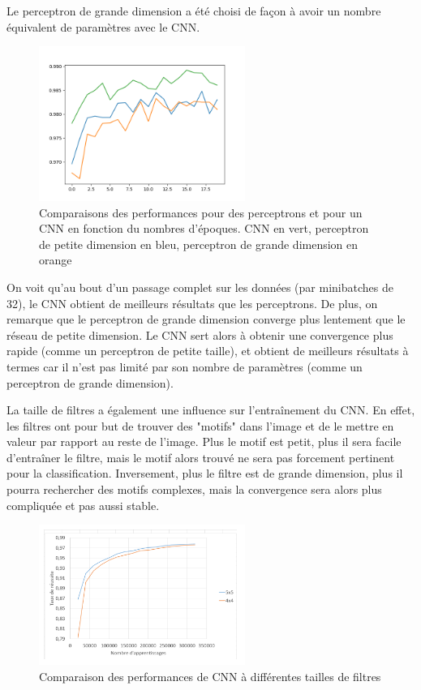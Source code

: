 Le perceptron de grande dimension a été choisi de façon à avoir un nombre équivalent de paramètres avec le CNN.

\begin{figure}[h]
    \center 
    \includegraphics[width=0.6\textwidth]{img/fc_vs_cnn.png}
    \caption[Comparaisons des performances pour des perceptrons et pour un CNN]{Comparaisons des performances pour des perceptrons et pour un CNN en fonction du nombres d'époques. CNN en vert, perceptron de petite dimension en bleu, perceptron de grande dimension en orange}
\end{figure}

On voit qu'au bout d'un passage complet sur les données (par minibatches de 32), le CNN obtient de meilleurs résultats que les 
perceptrons. De plus, on remarque que le perceptron de grande dimension converge plus lentement que le réseau de petite dimension.
Le CNN sert alors à obtenir une convergence plus rapide (comme un perceptron de petite taille),
et obtient de meilleurs résultats à termes car il n'est pas limité par son nombre de paramètres (comme un perceptron de grande dimension).

La taille de filtres a également une influence sur l'entraînement du CNN. En effet, les filtres ont pour but de trouver des "motifs" dans l'image et de le mettre en valeur par rapport au reste de l'image. Plus le motif est petit, plus il sera facile d'entraîner le filtre, mais le motif alors trouvé ne sera pas forcement pertinent pour la classification. Inversement, plus le filtre est de grande dimension, plus il pourra rechercher des motifs complexes, mais la convergence sera alors plus compliquée et pas aussi stable.


\begin{figure}[h]
    \center 
    \includegraphics[width=0.6\textwidth]{img/comparaison_filtres.png}
    \caption{Comparaison des performances de CNN à différentes tailles de filtres}
\end{figure}

